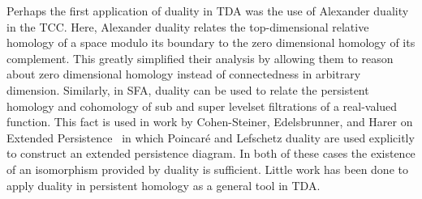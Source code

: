 Perhaps the first application of duality in TDA was the use of Alexander duality in the TCC.
Here, Alexander duality relates the top-dimensional relative homology of a space modulo its boundary to the zero dimensional homology of its complement.
This greatly simplified their analysis by allowing them to reason about zero dimensional homology instead of connectedness in arbitrary dimension.
Similarly, in SFA, duality can be used to relate the persistent homology and cohomology of sub and super levelset filtrations of a real-valued function.
This fact is used  in work by Cohen-Steiner, Edelsbrunner, and Harer on Extended Persistence~\cite{cohen09extending} in which Poincar\'e and Lefschetz duality are used explicitly to construct an extended persistence diagram.
In both of these cases the existence of an isomorphism provided by duality is sufficient.
Little work has been done to apply duality in persistent homology as a general tool in TDA.

